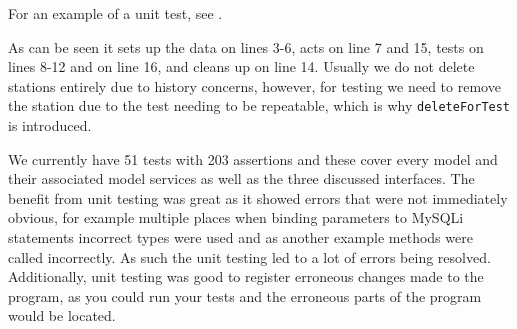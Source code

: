 For an example of a unit test, see .

As can be seen it sets up the data on lines 3-6, acts on line 7 and 15, tests on lines 8-12 and on line 16, and cleans up on line 14.
Usually we do not delete stations entirely due to history concerns, however, for testing we need to remove the station due to the test needing to be repeatable, which is why \texttt{deleteForTest} is introduced.

We currently have 51 tests with 203 assertions and these cover every model and their associated model services as well as the three discussed interfaces. 
The benefit from unit testing was great as it showed errors that were not immediately obvious, for example multiple places when binding parameters to MySQLi statements incorrect types were used and as another example methods were called incorrectly.
As such the unit testing led to a lot of errors being resolved.
Additionally, unit testing was good to register erroneous changes made to the program, as you could run your tests and the erroneous parts of the program would be located.